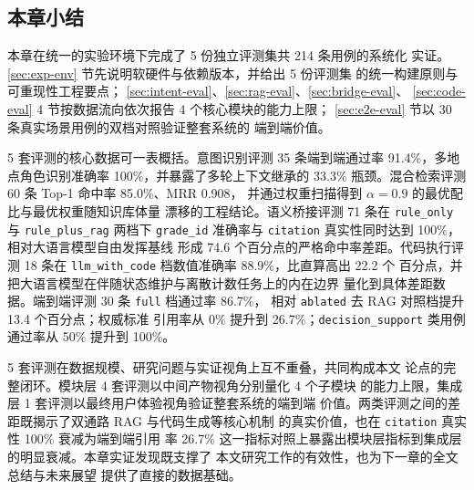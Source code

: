 
\subsection{本章小结}
\label{sec:eval-summary}

本章在统一的实验环境下完成了 5 份独立评测集共 214 条用例的系统化
实证。\ref{sec:exp-env} 节先说明软硬件与依赖版本，并给出 5 份评测集
的统一构建原则与可重现性工程要点；
\ref{sec:intent-eval}、\ref{sec:rag-eval}、\ref{sec:bridge-eval}、
\ref{sec:code-eval} 4 节按数据流向依次报告 4 个核心模块的能力上限；
\ref{sec:e2e-eval} 节以 30 条真实场景用例的双档对照验证整套系统的
端到端价值。

5 套评测的核心数据可一表概括。意图识别评测 35 条端到端通过率
91.4\%，多地点角色识别准确率 100\%，并暴露了多轮上下文继承的
33.3\% 瓶颈。混合检索评测 60 条 Top-1 命中率 85.0\%、MRR 0.908，
并通过权重扫描得到 $\alpha=0.9$ 的最优配比与最优权重随知识库体量
漂移的工程结论。语义桥接评测 71 条在 \texttt{rule\_\bk{}only} 与
\texttt{rule\_\bk{}plus\_\bk{}rag} 两档下 \texttt{grade\_\bk{}id} 准确率与
\texttt{citation} 真实性同时达到 100\%，相对大语言模型自由发挥基线
形成 74.6 个百分点的严格命中率差距。代码执行评测 18 条在
\texttt{llm\_\bk{}with\_\bk{}code} 档数值准确率 88.9\%，比直算高出 22.2 个
百分点，并把大语言模型在伴随状态维护与离散计数任务上的内在边界
量化到具体差距数据。端到端评测 30 条 \texttt{full} 档通过率 86.7\%，
相对 \texttt{ablated} 去 RAG 对照档提升 13.4 个百分点；权威标准
引用率从 0\% 提升到 26.7\%；\texttt{decision\_\bk{}support} 类用例
通过率从 50\% 提升到 100\%。

5 套评测在数据规模、研究问题与实证视角上互不重叠，共同构成本文
论点的完整闭环。模块层 4 套评测以中间产物视角分别量化 4 个子模块
的能力上限，集成层 1 套评测以最终用户体验视角验证整套系统的端到端
价值。两类评测之间的差距既揭示了双通路 RAG 与代码生成等核心机制
的真实价值，也在 \texttt{citation} 真实性 100\% 衰减为端到端引用
率 26.7\% 这一指标对照上暴露出模块层指标到集成层的明显衰减。本章实证发现既支撑了
本文研究工作的有效性，也为下一章的全文总结与未来展望
提供了直接的数据基础。
